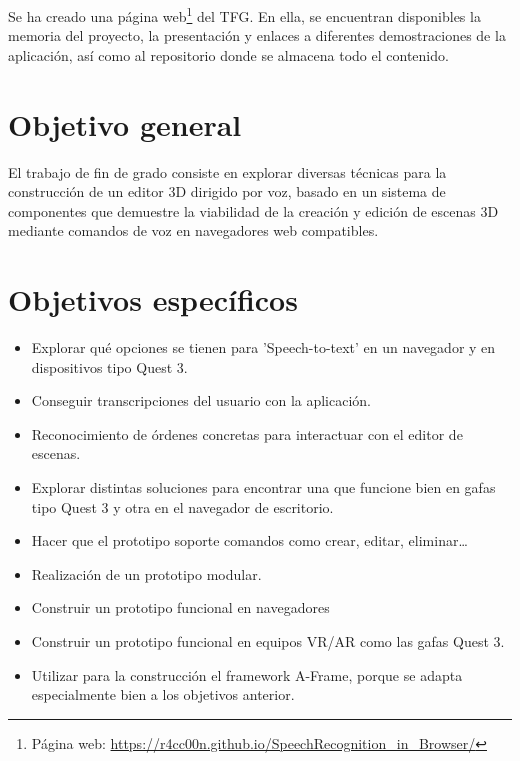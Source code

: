 \documentclass[a4paper, 12pt]{book}
\begin{document}
Se ha creado una página web\footnote{Página web: \scriptsize\url{https://r4cc00n.github.io/SpeechRecognition_in_Browser/}} del TFG.
En ella, se encuentran disponibles la memoria del proyecto, la presentación y enlaces a diferentes demostraciones de la aplicación, así como al repositorio donde se almacena todo el contenido.

\section{Objetivo general} %
\label{sec:objetivo-general} %

El trabajo de fin de grado consiste en explorar diversas técnicas para la construcción de un editor 3D dirigido por voz,
basado en un sistema de componentes que demuestre la viabilidad de la creación y edición de escenas 3D mediante comandos de voz en navegadores web compatibles.

\section{Objetivos específicos}
\label{sec:objetivos-especificos}

\begin{itemize}
\setlength\itemsep{0.3em}  %
\item Explorar qué opciones se tienen para 'Speech-to-text' en un navegador y en dispositivos tipo Quest 3.
\item Conseguir transcripciones del usuario con la aplicación.
\item Reconocimiento de órdenes concretas para interactuar con el editor de escenas.
\item Explorar distintas soluciones para encontrar una que funcione bien en gafas tipo Quest 3 y otra en el navegador de escritorio.
\item Hacer que el prototipo soporte comandos como crear, editar, eliminar\dots
\item Realización de un prototipo modular.
\item Construir un prototipo funcional en navegadores
\item Construir un prototipo funcional en equipos VR/AR como las gafas Quest 3.
\item Utilizar para la construcción el framework A-Frame, porque se adapta especialmente bien a los objetivos anterior.
\end{itemize}
\end{document}

